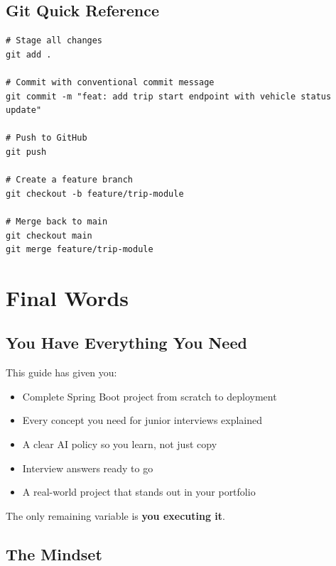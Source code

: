 \documentclass[12pt,a4paper]{report}
\begin{document}
\section{Git Quick Reference}

\begin{lstlisting}[style=bashstyle,caption=Daily Git Workflow]
# Stage all changes
git add .

# Commit with conventional commit message
git commit -m "feat: add trip start endpoint with vehicle status update"

# Push to GitHub
git push

# Create a feature branch
git checkout -b feature/trip-module

# Merge back to main
git checkout main
git merge feature/trip-module
\end{lstlisting}

\chapter{Final Words}

\section{You Have Everything You Need}

This guide has given you:
\begin{itemize}
  \item Complete Spring Boot project from scratch to deployment
  \item Every concept you need for junior interviews explained
  \item A clear AI policy so you learn, not just copy
  \item Interview answers ready to go
  \item A real-world project that stands out in your portfolio
\end{itemize}

The only remaining variable is \textbf{you executing it}.

\section{The Mindset}
\end{document}
